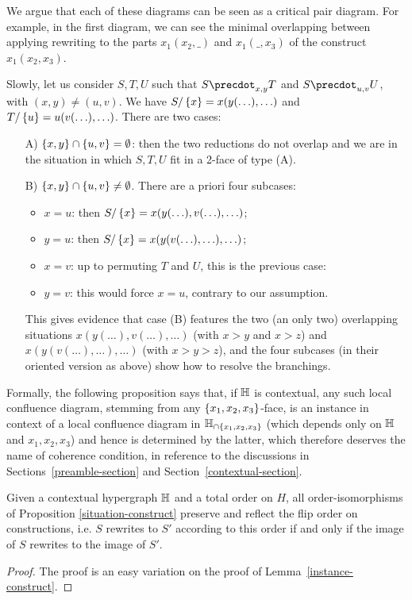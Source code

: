 We argue that each of these diagrams can be seen as a critical pair diagram. For example, in the first diagram, we can see the minimal overlapping between applying rewriting to the parts
$x_1(x_2,\_)$ and $x_1(\_,x_3)$ of the construct $x_1(x_2,x_3)$. 

Slowly, let us consider  $S,T,U$ such that $S\precdot_{x,y} T$ and $S\precdot_{u,v} U$, with  $(x,y)\neq(u,v)$.
We have
$S/\left\{x\right\}=x(y(\ldots),\ldots)$ and $T/\left\{u\right\}=u(v(\ldots),\ldots)$. There are two cases:
\begin{itemize}
\item[A)] $\left\{x,y\right\}\cap\left\{u,v\right\}=\emptyset$: then the two reductions do not overlap and we are in the situation in which $S,T,U$ fit in a 2-face of type (A).
\item[B)] $\left\{x,y\right\}\cap\left\{u,v\right\}\neq\emptyset$. There are a priori four subcases:
\begin{itemize}
\item $x=u$: then $S/\left\{x\right\}=x(y(\ldots),v(\ldots),\ldots)$;
\item $y=u$: then  $S/\left\{x\right\}=x(y(v(\ldots),\ldots),\ldots)$;
\item $x=v$: up to permuting $T$ and $U$, this is the previous case:
\item $y=v$: this would force $x=u$, contrary to our assumption.
\end{itemize}
This gives evidence that case (B) features the two (an only two) overlapping situations $x(y(\ldots),v(\ldots),\ldots)$ (with $x>y$ and $x>z$) and 
$x(y(v(\ldots),\ldots),\ldots)$ (with $x>y>z$), and the four subcases  (in their oriented version as above) show how to resolve the branchings.
\end{itemize}

Formally, the following proposition says that, if ${\mathbb H}$ is  contextual, any such local confluence diagram, stemming from any $\left\{x_1,x_2,x_3\right\}$-face, is an instance in context of a local confluence diagram in  ${\mathbb H}_{\cap \left\{x_1,x_2,x_3\right\}}$ (which depends only on ${\mathbb H}$ and ${x_1,x_2,x_3}$) and hence is determined by the latter, which therefore deserves the name of coherence condition, in reference to the discussions in Sections~\ref{preamble-section} and Section~\ref{contextual-section}.

\begin{proposition} Given a contextual hypergraph ${\mathbb H}$ and a total order on $H$, all order-isomorphisms
of
Proposition \ref{situation-construct} preserve and reflect the flip order on constructions, i.e.  $S$ rewrites to $S'$ according to this order if and only if the image of $S$ rewrites to the image of $S'$.
\end{proposition}

\begin{proof} The proof is an easy variation on the proof of Lemma~\ref{instance-construct}. 
\end{proof}
